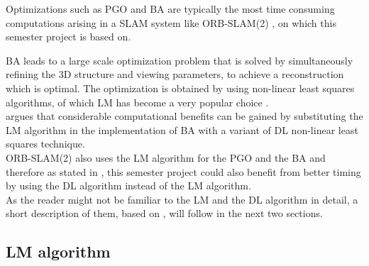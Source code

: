 Optimizations such as \acf{PGO} and \acf{BA} are typically the most time consuming computations arising in a \ac{SLAM} system like ORB-SLAM(2) \cite{Mur-Artal2015}, \cite{Mur-Artal2016} on which this semester project is based on.

\ac{BA} leads to a large scale optimization problem that is solved by simultaneously refining the 3D structure and viewing parameters, to achieve a reconstruction which is optimal. The optimization is obtained by using non-linear least squares algorithms, of which \acf{LM} has become a very popular choice \cite{Lourakis2005}.\\

\cite{Lourakis2005} argues that considerable computational benefits can be gained by substituting the \ac{LM} algorithm in the implementation of \ac{BA} with a variant of \acf{DL} non-linear least squares technique.\\

ORB-SLAM(2) also uses the \ac{LM} algorithm for the \ac{PGO} and the \ac{BA} and therefore as stated in \cite{Lourakis2005}, this semester project could also benefit from better timing by using the \ac{DL} algorithm instead of the \ac{LM} algorithm.\\

As the reader might not be familiar to the \ac{LM} and the \ac{DL} algorithm in detail, a short description of them, based on \cite{Lourakis2005}, will follow in the next two sections.

\subsection{\acf{LM} algorithm} 

